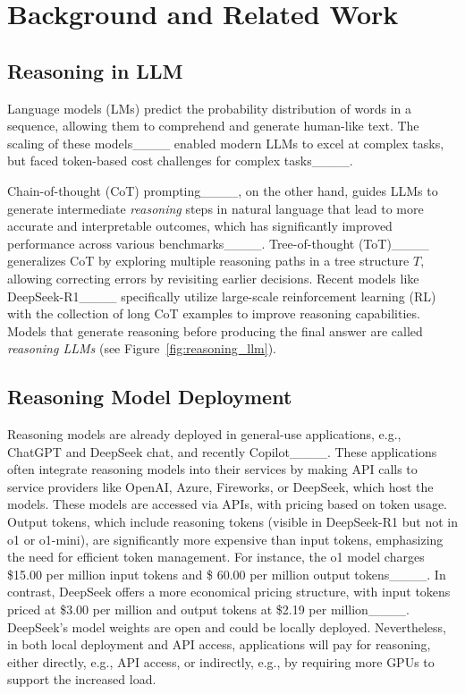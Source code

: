 \section{Background and Related Work}
\renewcommand\thefootnote{}%


\subsection{Reasoning in LLM}
Language models (LMs) predict the probability distribution of words in a sequence, allowing them to comprehend and generate human-like text. The scaling of these models____ enabled modern LLMs to excel at complex tasks, but faced token-based cost challenges for complex tasks____.

Chain-of-thought (CoT) prompting____, on the other hand, guides LLMs to generate intermediate \emph{reasoning} steps in natural language that lead to more accurate and interpretable outcomes, which has significantly improved performance across various benchmarks____. Tree-of-thought (ToT)____ generalizes CoT by exploring multiple reasoning paths in a tree structure $T$, allowing correcting errors by revisiting earlier decisions. Recent models like DeepSeek-R1____ specifically utilize large-scale reinforcement learning (RL) with the collection of long CoT examples to improve reasoning capabilities. Models that generate reasoning before producing the final answer are  called \textit{reasoning LLMs} (see Figure~\ref{fig:reasoning_llm}). 






















\subsection{Reasoning Model Deployment}

Reasoning models are already deployed in general-use applications, e.g., ChatGPT and DeepSeek chat, and recently Copilot____. These applications often integrate reasoning models into their services by making API calls to service providers like OpenAI, Azure, Fireworks, or DeepSeek, which host the models. These models are accessed via APIs, with pricing based on token usage. Output tokens, which include reasoning tokens (visible in DeepSeek-R1 but not in o1 or o1-mini), are significantly more expensive than input tokens, emphasizing the need for efficient token management. For instance, the o1 model charges \$15.00 per million input tokens and \$ 60.00 per million output tokens____. In contrast, DeepSeek offers a more economical pricing structure, with input tokens priced at \$3.00 per million and output tokens at \$2.19 per million____. DeepSeek's model weights are open and could be locally deployed. Nevertheless,   in both local deployment and API access, applications will pay for reasoning, either directly, e.g., API access, or indirectly, e.g., by requiring more GPUs to support the increased load. 

